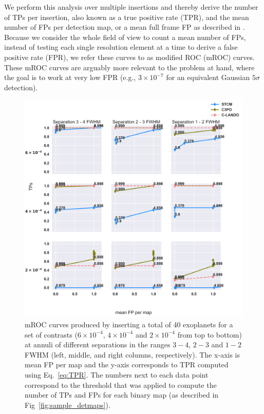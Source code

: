 \documentclass{aa}
\begin{document}
We perform this analysis over multiple insertions and thereby derive the number of TPs per insertion, also known as a true positive rate (TPR), and the mean number of FPs per detection map, or a mean full frame FP as described in \citet{2018Gomez}. Because we consider the whole field of view to count a mean number of FPs, instead of testing each single resolution element at a time to derive a false positive rate (FPR), we refer these curves to as modified ROC (mROC) curves. These mROC curves are arguably more relevant to the problem at hand, where the goal is to work at very low FPR (e.g., $3\times 10^{-7}$ for an equivalent Gaussian $5\sigma$ detection).

\begin{figure}
\centering
    \includegraphics[width=1.0\textwidth]{fig4_dec2023.png}
\caption{ mROC curves produced by inserting a total of 40 exoplanets for a set of contrasts ($6 \times 10^{-4}$, $4 \times 10^{-4}$ and $2 \times 10^{-4}$ from top to bottom) at annuli of different separations in the ranges $3-4$, $2-3$ and $1-2$ FWHM (left, middle, and right columns, respectively).
The x-axis is mean FP per map and the y-axis corresponds to TPR computed using Eq.~\ref{eq:TPR}. 
The numbers next to each data point correspond to the threshold that was applied to compute the number of TPs and FPs for each binary map (as described in Fig~\ref{fig:sample_detmaps}).
}
    \label{fig:fig_4}
\end{figure}
\end{document}
